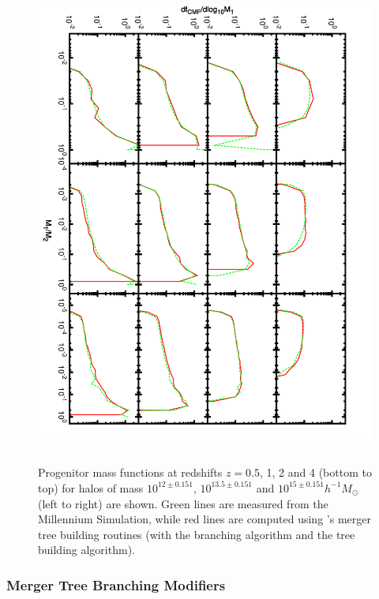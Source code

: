 \begin{figure}
 \begin{center}
 \includegraphics[height=160mm,angle=90]{../plots/progenitorMassFunction.pdf}
 \end{center}
 \caption{Progenitor mass functions at redshifts $z=0.5$, 1, 2 and 4 (bottom to top) for halos of mass $10^{12\pm0.151}$, $10^{13.5\pm0.151}$ and $10^{15\pm0.151}h^{-1}M_\odot$ (left to right) are shown. Green lines are measured from the Millennium Simulation, while red lines are computed using \glc's merger tree building routines (with the \cite{parkinson_generating_2008} branching algorithm and the \cite{cole_hierarchical_2000} tree building algorithm).}
 \label{fig:PCH_Progenitor_MFs}
\end{figure}

\subsubsection{Merger Tree Branching Modifiers}\label{sec:treeBranchingModifierMethod}

